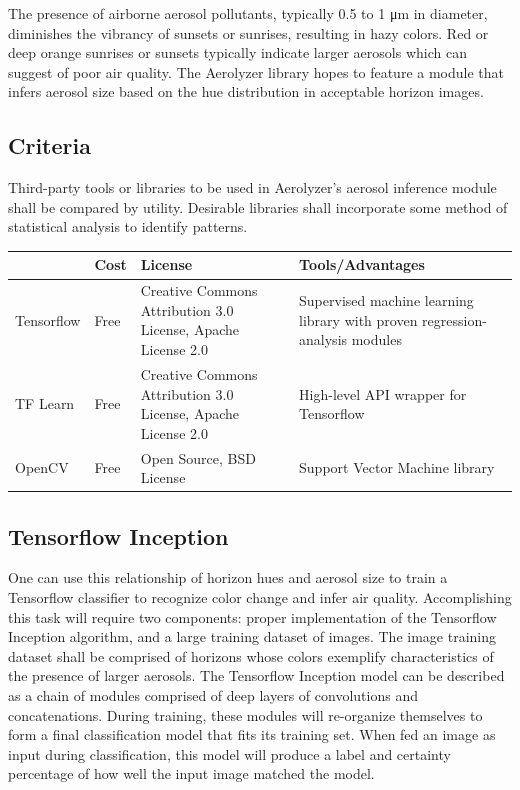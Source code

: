 \documentclass[onecolumn, draftclsnofoot,10pt, compsoc]{IEEEtran}
\begin{document}
\begin{singlespace}
		The presence of airborne aerosol pollutants, typically 0.5 to 1 μm in diameter, diminishes the vibrancy of sunsets or sunrises, resulting in hazy colors.
		Red or deep orange sunrises or sunsets typically indicate larger aerosols which can suggest of poor air quality. \cite{corfidi_2014}
		The Aerolyzer library hopes to feature a module that infers aerosol size based on the hue distribution in acceptable horizon images. 
		
	\subsection{Criteria}
		Third-party tools or libraries to be used in Aerolyzer's aerosol inference module shall be compared by utility.
		Desirable libraries shall incorporate some method of statistical analysis to identify patterns.

		\begin{center}
			\begin{tabular}{|l|p{3cm}|p{5cm}|p{5cm}|}
			\hline \textbf{} & \textbf{Cost} & \textbf{License} & \textbf{Tools/Advantages} \\\hline
			Tensorflow & Free & Creative Commons Attribution 3.0 License, Apache License 2.0 & Supervised machine learning library with proven regression-analysis modules\\\hline
			TF Learn & Free & Creative Commons Attribution 3.0 License, Apache License 2.0 & High-level API wrapper for Tensorflow\\\hline
			OpenCV & Free & Open Source, BSD License & Support Vector Machine library\\\hline
			\end{tabular}
		\end{center}

	\subsection{Tensorflow Inception}
		One can use this relationship of horizon hues and aerosol size to train a Tensorflow classifier to recognize color change and infer air quality.
		Accomplishing this task will require two components: proper implementation of the Tensorflow Inception algorithm, and a large training dataset of images.
		The image training dataset shall be comprised of horizons whose colors exemplify characteristics of the presence of larger aerosols.
		The Tensorflow Inception model can be described as a chain of modules comprised of deep layers of convolutions and concatenations.
		During training, these modules will re-organize themselves to form a final classification model that fits its training set.
		When fed an image as input during classification, this model will produce a label and certainty percentage of how well the input image matched the model. \cite{tensorflow}


\end{singlespace}
\end{document}
